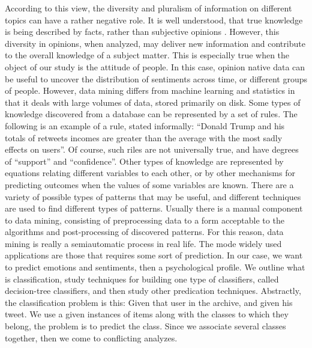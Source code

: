 \documentclass{acmtog} %
\begin{document}
\begin{itemize}
\begin{table}[H]
\label{tab:cross_tab}
\end{table}

According to this view, the diversity and pluralism of information on different topics can have a rather negative role. It is well understood, that true knowledge is being described by facts, rather than subjective opinions \cite{ThakkarP15}. However, this diversity in opinions, when analyzed, may deliver new information and contribute to the overall knowledge of a subject matter. This is especially true when the object of our study is the attitude of people. In this case, opinion native data can be useful to uncover the distribution of sentiments across time, or different groups of people. However, data mining differs from machine learning and statistics in that it deals with large volumes of data, stored primarily on disk. Some types of knowledge discovered from a database can be represented by a set of rules. The following is an example of a rule, stated informally: “Donald Trump and his totals of retweets incomes are greater than the average with the most sadly effects on users”. Of course, such riles are not universally true, and have degrees of “support” and “confidence”. Other types of knowledge are represented by equations relating different variables to each other, or by other mechanisms for predicting outcomes when the values of some variables are known. There are a variety of possible types of patterns that may be useful, and different techniques are used to find different types of patterns. Usually there is a manual component to data mining, consisting of preprocessing data to a form acceptable to the algorithms and post-processing of discovered patterns. For this reason, data mining is really a semiautomatic process in real life. The mode widely used applications are those that requires some sort of prediction. In our case, we want to predict emotions and sentiments, then a psychological profile. We outline what is classification, study techniques for building one type of classifiers, called decision-tree classifiers, and then study other predication techniques. Abstractly, the classification problem is this: Given that user in the archive, and given his tweet. We use a given instances of items along with the classes to which they belong, the problem is to predict the class. Since we associate several classes together, then we come to conflicting analyzes. 


\end{itemize}
\end{document}
